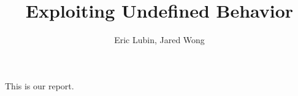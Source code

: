 \documentclass[10pt]{article}
\title{Exploiting Undefined Behavior}
\author{Eric Lubin, Jared Wong}
\begin{document}
\maketitle

This is our report.
\end{document}

